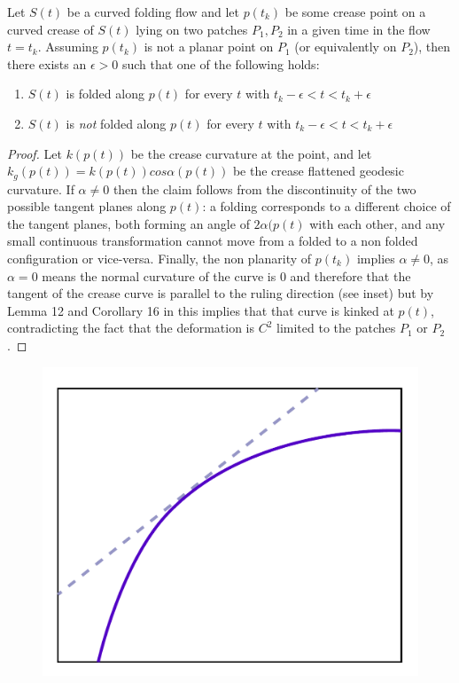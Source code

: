 \begin{theorem}\label{Thm:curved_folding_open_condition}
Let $S(t)$ be a curved folding flow and let $p(t_k)$ be some crease point on a curved crease of $S(t)$ lying on two patches $P_1,P_2$ in a given time in the flow $t=t_k$. Assuming $p(t_k)$ is not a planar point on $P_1$ (or equivalently on $P_2$), then there exists an $\epsilon > 0$ such that one of the following holds:
\begin{enumerate}
	\item $S(t)$ is folded along $p(t)$ for every $t$ with $t_k-\epsilon < t < t_k+\epsilon$
	\item $S(t)$ is \emph{not} folded along $p(t)$ for every $t$ with  $t_k-\epsilon < t < t_k+\epsilon$
\end{enumerate}
\end{theorem}
\begin{proof}
Let $k(p(t))$ be the crease curvature at the point, and let $k_g(p(t)) = k(p(t))cos\alpha(p(t))$ be the crease flattened geodesic curvature. If $\alpha \neq 0$ then the claim follows from the discontinuity of the two possible tangent planes along $p(t)$: a folding corresponds to a different choice of the tangent planes, both forming an angle of $2\alpha(p(t)$ with each other, and any small continuous transformation cannot move from a folded to a non folded configuration or vice-versa. Finally, the non planarity of $p(t_k)$ implies $\alpha \neq 0$, as $\alpha = 0$ means the normal curvature of the curve is $0$ and therefore that the tangent of the crease curve is parallel to the ruling direction (see inset) but by Lemma 12 and Corollary 16 in \cite{demaine_lens} this implies that that curve is kinked at  $p(t)$, contradicting the fact that the deformation is $C^2$ limited to the patches $P_1$ or $P_2$.
\end{proof}
\setlength{\columnsep}{8pt}%
\begin{figure}
  \centering
  \includegraphics[width=\linewidth]{figures/ruling_tangent_to_a_curved_fold}
\end{figure}

